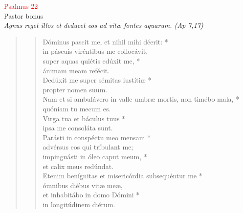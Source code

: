 
\begin{center}
 \textcolor{red}{Psalmus 22}\\
Pastor bonus\\
\textit{\small Agnus reget illos et deducet eos ad vitæ fontes aquarum. (Ap 7,17)}
\end{center}
\begin{quote}
 


\begin{verse}
Dóminus pascit me, et nihil mihi déerit: *\\
in páscuis viréntibus me collocávit,\\
\vin super aquas quiétis edúxit me, *\\
\vin ánimam meam refécit.\\
Dedúxit me super sémitas iustítiæ *\\
propter nomen suum.\\
\vin Nam et si ambulávero in valle umbræ mortis, non timébo mala, *\\
\vin quóniam tu mecum es.\\
Virga tua et báculus tuus *\\
ipsa me consoláta sunt.\\
\vin Parásti in conspéctu meo mensam *\\
\vin advérsus eos qui tríbulant me;\\
impinguásti in óleo caput meum, *\\
et calix meus redúndat.\\
\vin Etenim benígnitas et misericórdia subsequéntur me *\\
\vin ómnibus diébus vitæ meæ,\\
et inhabitábo in domo Dómini *\\
in longitúdinem diérum.\\
\end{verse}

\end{quote}
\vspace{1cm}


